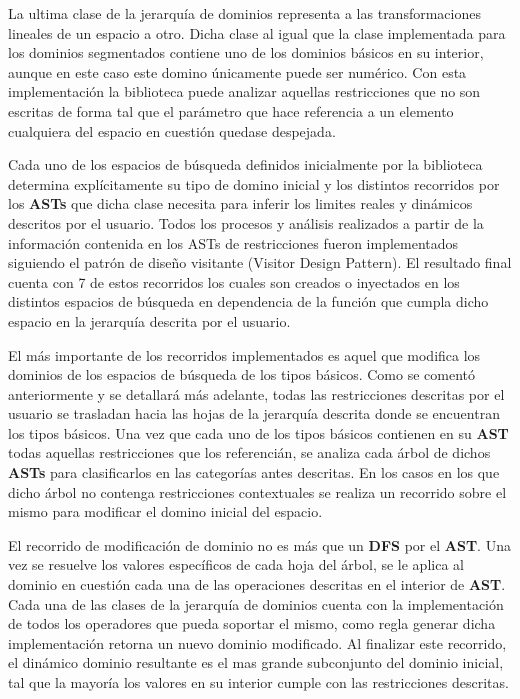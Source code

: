La ultima clase de la jerarquía de dominios representa a las transformaciones lineales de un espacio a otro. Dicha clase
al igual que la clase implementada para los dominios segmentados contiene uno de los dominios básicos en su interior,
aunque en este caso este domino únicamente puede ser numérico. Con esta implementación la biblioteca puede analizar
aquellas restricciones que no son escritas de forma tal que el parámetro que hace referencia a un elemento cualquiera
del espacio en cuestión quedase despejada.


Cada uno de los espacios de búsqueda definidos inicialmente por la biblioteca determina explícitamente su tipo de domino
inicial y los distintos recorridos por los {\bf ASTs} que dicha clase necesita para inferir los limites reales y dinámicos
descritos por el usuario. Todos los procesos y análisis realizados a partir de la información contenida en los ASTs de
restricciones fueron implementados siguiendo el patrón de diseño visitante (Visitor Design Pattern). El resultado final
cuenta con 7 de estos recorridos los cuales son creados o inyectados en los distintos espacios de búsqueda en dependencia
de la función que cumpla dicho espacio en la jerarquía descrita por el usuario.

El más importante de los recorridos implementados es aquel que modifica los dominios de los espacios de búsqueda de los
tipos básicos. Como se comentó anteriormente y se detallará más adelante, todas las restricciones descritas por el usuario
se trasladan hacia las hojas de la jerarquía descrita donde se encuentran los tipos básicos. Una vez que cada uno de los
tipos básicos contienen en su {\bf AST} todas aquellas restricciones que los referencián, se analiza cada árbol de dichos {\bf ASTs}
para clasificarlos en las categorías antes descritas. En los casos en los que dicho árbol no contenga restricciones
contextuales se realiza un recorrido sobre el mismo para modificar el domino inicial del espacio.

El recorrido de modificación de dominio no es más que un {\bf DFS} por el {\bf AST}. Una vez se resuelve los valores específicos de cada
hoja del árbol, se le aplica al dominio en cuestión cada una de las operaciones descritas en el interior de {\bf AST}. Cada una de
las clases de la jerarquía de dominios cuenta con la implementación de todos los operadores que pueda soportar el mismo, como
regla generar dicha implementación retorna un nuevo dominio modificado. Al finalizar este recorrido, el dinámico dominio
resultante es el mas grande subconjunto del dominio inicial, tal que la mayoría los valores en su interior cumple con las
restricciones descritas.

